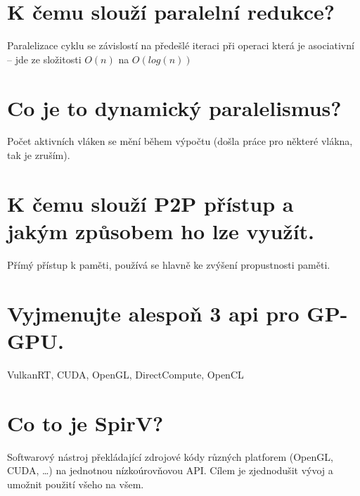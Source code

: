\section{K čemu slouží paralelní redukce?}
	Paralelizace cyklu se závislostí na předešlé iteraci při operaci která je asociativní -- jde ze složitosti $O(n)$ na $O(log(n))$


\section{Co je to dynamický paralelismus?}
	Počet aktivních vláken se mění během výpočtu (došla práce pro některé vlákna, tak je zruším).
	



\section{K čemu slouží P2P přístup a jakým způsobem ho lze využít.}
	Přímý přístup k paměti, používá se hlavně ke zvýšení propustnosti paměti.
	



\section{Vyjmenujte alespoň 3 api pro GP-GPU.}
	VulkanRT, CUDA, OpenGL, DirectCompute, OpenCL


\section{Co to je SpirV?}
	Softwarový nástroj překládající zdrojové kódy různých platforem (OpenGL, CUDA, \dots) na jednotnou nízkoúrovňovou API. Cílem je zjednodušit vývoj a umožnit použití všeho na všem.
	







